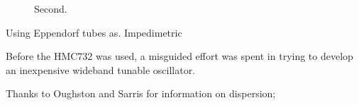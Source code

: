 \documentclass[paper.tex]{subfiles}
\begin{document}
\begin{figure}[H]
	\centering
	\caption{Second.}
	\hfill
	
\end{figure}


Using Eppendorf tubes as. Impedimetric 

Before the HMC732 was used, a misguided effort was spent in trying to develop an inexpensive wideband tunable oscillator. 


Thanks to Oughston and Sarris for information on dispersion; 
\end{document}
